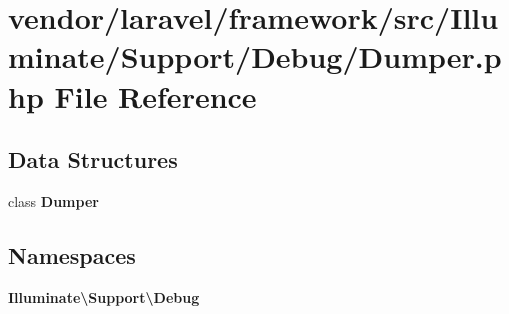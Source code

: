 \section{vendor/laravel/framework/src/\+Illuminate/\+Support/\+Debug/\+Dumper.php File Reference}
\label{laravel_2framework_2src_2_illuminate_2_support_2_debug_2_dumper_8php}
\subsection*{Data Structures}
\begin{DoxyCompactItemize}
\item 
class {\bf Dumper}
\end{DoxyCompactItemize}
\subsection*{Namespaces}
\begin{DoxyCompactItemize}
\item 
 {\bf Illuminate\textbackslash{}\+Support\textbackslash{}\+Debug}
\end{DoxyCompactItemize}
